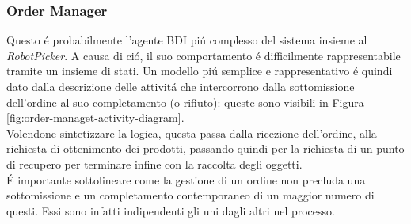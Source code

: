 \subsubsection{Order Manager}
Questo \'e probabilmente l'agente BDI pi\'u complesso del sistema insieme al \textit{RobotPicker}. A causa di ci\'o, il suo comportamento \'e difficilmente rappresentabile tramite un insieme di stati. Un modello pi\'u semplice e rappresentativo \'e quindi dato dalla descrizione delle attivit\'a che intercorrono dalla sottomissione dell'ordine al suo completamento (o rifiuto): queste sono visibili in Figura \ref{fig:order-managet-activity-diagram}.\\
Volendone sintetizzare la logica, questa passa dalla ricezione dell'ordine, alla richiesta di ottenimento dei prodotti, passando quindi per la richiesta di un punto di recupero per terminare infine con la raccolta degli oggetti.\\
\'E importante sottolineare come la gestione di un ordine non precluda una sottomissione e un completamento contemporaneo di un maggior numero di questi. Essi sono infatti indipendenti gli uni dagli altri nel processo.
